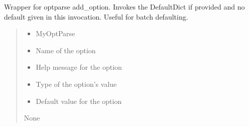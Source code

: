 \documentclass[letterpaper,10pt,english]{sphinxmanual}
\begin{document}
\begin{fulllineitems}

\begin{fulllineitems}
\label{\detokenize{api/killMS.Parset:killMS.Parset.MyOptParse.MyOptParse.add_option}}
\pysigstartsignatures
{}
\pysigstopsignatures
\sphinxAtStartPar
Wrapper for optparse add\_option.
Invokes the DefaultDict if provided and no default given in this invocation.
Useful for batch defaulting.
\begin{quote}\begin{description}
\begin{itemize}
\item {} 
\sphinxAtStartPar
{} \textendash{} MyOptParse

\item {} 
\sphinxAtStartPar
{} \textendash{} Name of the option

\item {} 
\sphinxAtStartPar
{} \textendash{} Help message for the option

\item {} 
\sphinxAtStartPar
{} \textendash{} Type of the option’s value

\item {} 
\sphinxAtStartPar
{} \textendash{} Default value for the option

\end{itemize}

\sphinxAtStartPar
None

\end{description}\end{quote}

\end{fulllineitems}


\end{fulllineitems}
\end{document}

